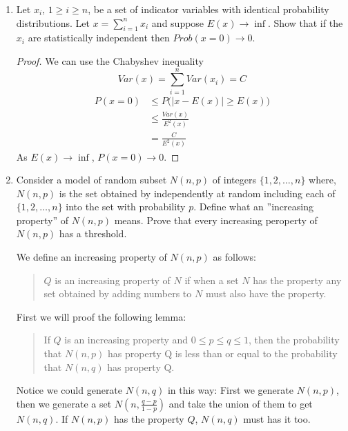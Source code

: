 \documentclass[a4paper, 12pt]{mcshw}
\begin{document}
\begin{enumerate}
    \item Let $x_i$, $1 \geq i \geq n$, be a set of indicator variables with identical probability distributions. Let $x = \sum_{i = 1}^{n}x_i$ and suppose $E(x) \to \inf$. Show that if the $x_i$ are statistically independent then $Prob(x = 0) \to 0$.
        \begin{proof}
            We can use the Chabyshev inequality
            $$Var(x) = \sum_{i = 1}^{n}Var(x_i) = C$$
            \begin{align*}
                P(x = 0) &\leq P\bigl(|x - E(x)| \geq E(x)\bigr)\\
                &\leq \frac{Var(x)}{E^2(x)}\\
                &= \frac{C}{E^2(x)}
            \end{align*}
            As $E(x) \to \inf$, $P(x = 0) \to 0$.

        \end{proof}
    \item Consider a model of random subset $N(n, p)$ of integers $\{1, 2, \dots, n\}$ where, $N(n, p)$ is the set obtained by independently at random including each of $\{1, 2, \dots, n\}$ into the set with probability $p$. Define what an ''increasing property'' of $N(n, p)$ means. Prove that every increasing peroperty of $N(n, p)$ has a threshold.
        \begin{solution}
            We define an increasing property of $N(n, p)$ as follows: 
            \begin{quote}
                $Q$ is an increasing property of $N$ if when a set $N$ has the property any set obtained by adding numbers to $N$ must also have the property.
            \end{quote}
            First we will proof the following lemma: 
            \begin{quote}
                If $Q$ is an increasing property and $0 \leq p \leq q \leq 1$, then the probability that $N(n, p)$ has property Q is less than or equal to the probability that $N(n, q)$ has property Q.
            \end{quote}
            Notice we could generate $N(n, q)$ in this way: First we generate $N(n, p)$, then we generate a set $N(n, \frac{q - p}{1 - p})$ and take the union of them to get $N(n, q)$. If $N(n, p)$ has the property $Q$, $N(n, q)$ must has it too. 


\end{solution}
\end{enumerate}
\end{document}

